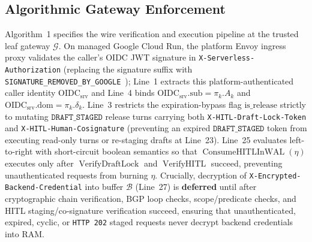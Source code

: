 \documentclass[conference,10pt]{IEEEtran}
\begin{document}
\subsection{Algorithmic Gateway Enforcement}
Algorithm~1 specifies the wire verification and execution pipeline at the trusted leaf gateway $\mathcal{G}$. On managed Google Cloud Run, the platform Envoy ingress proxy validates the caller's OIDC JWT signature in \texttt{X-Serverless-Authorization} (replacing the signature suffix with \texttt{SIGNATURE\_REMOVED\_BY\_GOOGLE}~\cite{tsao2023cloudrun}); Line~1 extracts this platform-authenticated caller identity $\text{OIDC}_{\text{srv}}$ and Line~4 binds $\text{OIDC}_{\text{srv}}.\text{sub} = \pi_k.A_k$ and $\text{OIDC}_{\text{srv}}.\text{dom} = \pi_k.\delta_k$. Line~3 restricts the expiration-bypass flag $\text{is\_release}$ strictly to mutating $\texttt{DRAFT\_STAGED}$ release turns carrying both \texttt{X-HITL-Draft-Lock-Token} and \texttt{X-HITL-Human-Cosignature} (preventing an expired $\texttt{DRAFT\_STAGED}$ token from executing read-only turns or re-staging drafts at Line~23). Line~25 evaluates left-to-right with short-circuit boolean semantics so that $\operatorname{ConsumeHITLInWAL}(\eta)$ executes only after $\operatorname{VerifyDraftLock}$ and $\operatorname{VerifyHITL}$ succeed, preventing unauthenticated requests from burning $\eta$. Crucially, decryption of \texttt{X-Encrypted-Backend-Credential} into buffer $\mathcal{B}$ (Line~27) is \textbf{deferred} until after cryptographic chain verification, BGP loop checks, scope/predicate checks, and HITL staging/co-signature verification succeed, ensuring that unauthenticated, expired, cyclic, or \texttt{HTTP 202} staged requests never decrypt backend credentials into RAM.
\end{document}
